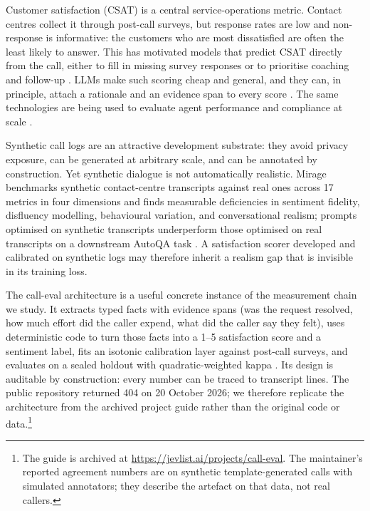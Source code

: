 \documentclass[11pt,a4paper]{article}
\begin{document}
Customer satisfaction (CSAT) is a central service-operations metric. Contact centres collect it
through post-call surveys, but response rates are low and non-response is informative: the
customers who are most dissatisfied are often the least likely to answer. This has motivated
models that predict CSAT directly from the call, either to fill in missing survey responses or
to prioritise coaching and follow-up \citep{manderscheid2024pcsat}. LLMs make such scoring cheap
and general, and they can, in principle, attach a rationale and an evidence span to every score
\citep{calleval2026,jevlist2026}. The same technologies are being used to evaluate agent
performance and compliance at scale \citep{chincha2025bellteus}.

Synthetic call logs are an attractive development substrate: they avoid privacy exposure, can be
generated at arbitrary scale, and can be annotated by construction. Yet synthetic dialogue is
not automatically realistic. Mirage benchmarks synthetic contact-centre transcripts against real
ones across 17 metrics in four dimensions and finds measurable deficiencies in sentiment
fidelity, disfluency modelling, behavioural variation, and conversational realism; prompts
optimised on synthetic transcripts underperform those optimised on real transcripts on a
downstream AutoQA task \citep{devanathan2026mirage}. A satisfaction scorer developed and
calibrated on synthetic logs may therefore inherit a realism gap that is invisible in its
training loss.

The call-eval architecture is a useful concrete instance of the measurement chain we study. It
extracts typed facts with evidence spans (was the request resolved, how much effort did the
caller expend, what did the caller say they felt), uses deterministic code to turn those facts
into a 1--5 satisfaction score and a sentiment label, fits an isotonic calibration layer against
post-call surveys, and evaluates on a sealed holdout with quadratic-weighted kappa
\citep{calleval2026,jevlist2026}. Its design is auditable by construction: every number can be
traced to transcript lines. The public repository returned 404 on 20 October 2026; we therefore
replicate the architecture from the archived project guide rather than the original code or
data.\footnote{The guide is archived at \url{https://jevlist.ai/projects/call-eval}. The
maintainer's reported agreement numbers are on synthetic template-generated calls with simulated
annotators; they describe the artefact on that data, not real callers.}
\end{document}
